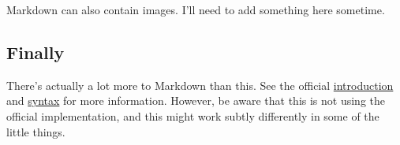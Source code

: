 Markdown can also contain images. I'll need to add something here
sometime.

\hypertarget{finally}{%
\subsection{Finally}\label{finally}}

There's actually a lot more to Markdown than this. See the official
\href{http://daringfireball.net/projects/markdown/basics}{introduction}
and \href{http://daringfireball.net/projects/markdown/syntax}{syntax}
for more information. However, be aware that this is not using the
official implementation, and this might work subtly differently in some
of the little things.
